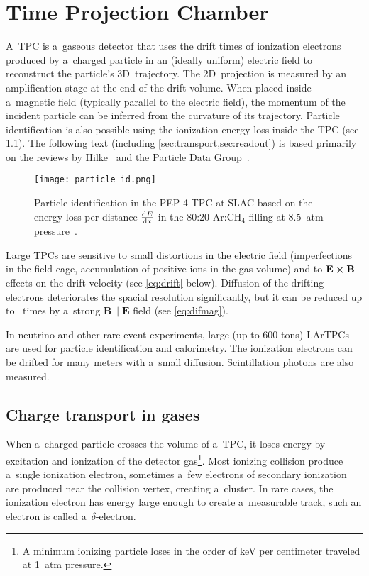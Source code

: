 \chapter{Time Projection Chamber}
\label{sec:tpc}
	A~\acf{TPC} is a~gaseous detector that uses the drift times of ionization electrons produced by a~charged particle in an (ideally uniform) electric field to reconstruct the particle's 3D~trajectory. The 2D~projection is measured by an amplification stage at the end of the drift volume. When placed inside a~magnetic field (typically parallel to the electric field), the momentum of the incident particle can be inferred from the curvature of its trajectory. Particle identification is also possible using the ionization energy loss inside the \ac{TPC} (see \cref{fig:particleid}). The following text (including \cref{sec:transport,sec:readout}) is based primarily on the reviews by Hilke~\cite{TPCs} and the Particle Data Group~\cite{pdg2024}.
	
	\begin{figure}[H]
		\centering
		\texttt{[image: particle\_id.png]}
		\caption{Particle identification in the PEP-4 \ac{TPC} at SLAC based on the energy loss per distance $\dv{E}{x}$ in the 80:20 Ar:CH$_4$ filling at \qty{8.5}{atm} pressure~\cite{pid_og,particleid}.}
		\label{fig:particleid}
	\end{figure}
	
	Large \acp{TPC} are sensitive to small distortions in the electric field (imperfections in the field cage, accumulation of positive ions in the gas volume) and to $\mathbf{E}\cross\mathbf{B}$ effects on the drift velocity (see \cref{eq:drift} below). Diffusion of the drifting electrons deteriorates the spacial resolution significantly, but it can be reduced up to ~times by a~strong $\mathbf{B}\parallel\mathbf{E}$ field (see \cref{eq:difmag}).
	
	In neutrino and other rare-event experiments, large (up to 600 tons) \acp{LArTPC} are used for particle identification and calorimetry. The ionization electrons can be drifted for many meters with a~small diffusion. Scintillation photons are also measured.
	
	\section{Charge transport in gases}
	\label{sec:transport}
		When a~charged particle crosses the volume of a~\ac{TPC}, it loses energy by excitation and ionization of the detector gas\footnote{A minimum ionizing particle loses in the order of \unit{\keV} per centimeter traveled at \qty{1}{atm} pressure.}. Most ionizing collision produce a~single ionization electron, sometimes a~few electrons of secondary ionization are produced near the collision vertex, creating a~cluster. In rare cases, the ionization electron has energy large enough to create a~measurable track, such an electron is called a~$\delta$\nobreakdash-electron.
		
